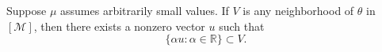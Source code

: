 Suppose $\mu$ assumes arbitrarily small values. If $V$ is any neighborhood of $\theta$ in $[\mathcal{M}]$, then there exists a nonzero vector $u$ such that
$$\{\alpha u : \alpha \in \mathbb{R}\} \subset V.$$
